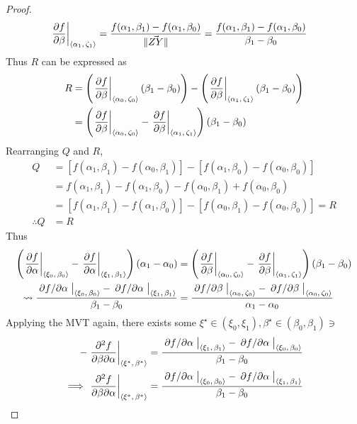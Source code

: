 \begin{lemma}
\begin{proof}
\begin{align*}
			\eval{\pdv{f}{\beta}}_{\point{\alpha_1}{\zeta_1}}&=\frac{f(\alpha_1,\beta_1)-f(\alpha_1,\beta_0)}{\lVert\vec{ZY}\rVert}=\frac{f(\alpha_1,\beta_1)-f(\alpha_1,\beta_0)}{\beta_1-\beta_0}
		\end{align*}
		Thus $R$ can be expressed as
		\begin{align*}
			R&=\left(\eval{\pdv{f}{\beta}}_{\point{\alpha_0}{\zeta_0}}\left(\beta_1-\beta_0\right)\right)-\left(\eval{\pdv{f}{\beta}}_{\point{\alpha_1}{\zeta_1}}\left(\beta_1-\beta_0\right)\right)\\
			&=\left(\eval{\pdv{f}{\beta}}_{\point{\alpha_0}{\zeta_0}}-\eval{\pdv{f}{\beta}}_{\point{\alpha_1}{\zeta_1}}\right)\left(\beta_1-\beta_0\right)
		\end{align*}
		Rearranging $Q$ and $R$,
		\begin{align*}
			Q&=[f(\alpha_1,\beta_1)-f(\alpha_0,\beta_1)]-[f(\alpha_1,\beta_0)-f(\alpha_0,\beta_0)]\\
			&=f(\alpha_1,\beta_1)-f(\alpha_1,\beta_0)-f(\alpha_0,\beta_1)+f(\alpha_0,\beta_0)\\
			&=[f(\alpha_1,\beta_1)-f(\alpha_1,\beta_0)]-[f(\alpha_0,\beta_1)-f(\alpha_0,\beta_0)]=R\\
			\therefore Q&=R
		\end{align*}
		Thus
		\begin{align}
			\notag\left(\eval{\pdv{f}{\alpha}}_{\point{\xi_0}{\beta_0}}-\eval{\pdv{f}{\alpha}}_{\point{\xi_1}{\beta_1}}\right)\left(\alpha_1-\alpha_0\right)&=\left(\eval{\pdv{f}{\beta}}_{\point{\alpha_0}{\zeta_0}}-\eval{\pdv{f}{\beta}}_{\point{\alpha_1}{\zeta_1}}\right)\left(\beta_1-\beta_0\right)\\
			\label{proof:SYMMETRY}\leadsto\frac{\eval{\pdv*{f}{\alpha}}_{\point{\xi_0}{\beta_0}}-\eval{\pdv*{f}{\alpha}}_{\point{\xi_1}{\beta_1}}}{\beta_1-\beta_0}&=\frac{\eval{\pdv*{f}{\beta}}_{\point{\alpha_0}{\zeta_0}}-\eval{\pdv*{f}{\beta}}_{\point{\alpha_0}{\zeta_0}}}{\alpha_1-\alpha_0}
		\end{align}
		Applying the MVT again, there exists some $\xi^\star\in(\xi_0,\xi_1),\beta^\star\in(\beta_0,\beta_1)\ni$
		\begin{align*}
			-\eval{\pdv{f}{\beta}{\alpha}}_{\point{\xi^\star}{\beta^\star}}&=\frac{\eval{\pdv*{f}{\alpha}}_{\point{\xi_1}{\beta_1}}-\eval{\pdv*{f}{\alpha}}_{\point{\xi_0}{\beta_0}}}{\beta_1-\beta_0}\\
			\implies\eval{\pdv{f}{\beta}{\alpha}}_{\point{\xi^\star}{\beta^\star}}&=\frac{\eval{\pdv*{f}{\alpha}}_{\point{\xi_0}{\beta_0}}-\eval{\pdv*{f}{\alpha}}_{\point{\xi_1}{\beta_1}}}{\beta_1-\beta_0}

\end{align*}
\end{proof}
\end{lemma}
